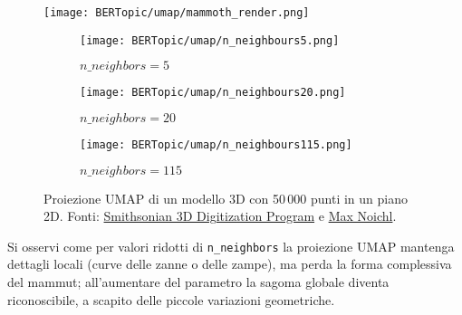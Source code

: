 \begin{figure}[H]
\centering
\texttt{[image: BERTopic/umap/mammoth\_render.png]}

\begin{subfigure}{0.32\textwidth}
    \centering
    \texttt{[image: BERTopic/umap/n\_neighbours5.png]}
    \caption{$n\_neighbors = 5$}
\end{subfigure}\hfill
\begin{subfigure}{0.32\textwidth}
    \centering
    \texttt{[image: BERTopic/umap/n\_neighbours20.png]}
    \caption{$n\_neighbors = 20$}
\end{subfigure}\hfill
\begin{subfigure}{0.32\textwidth}
    \centering
    \texttt{[image: BERTopic/umap/n\_neighbours115.png]}
    \caption{$n\_neighbors = 115$}
\end{subfigure}
\caption{Proiezione UMAP di un modello 3D con 50\,000 punti in un piano 2D. Fonti: \href{https://3d.si.edu/object/3d/mammuthus-primigenius-blumbach:341c96cd-f967-4540-8ed1-d3fc56d31f12}{Smithsonian 3D Digitization Program} e \href{https://www.maxnoichl.eu/projects/mammoth/}{Max Noichl}.}
\label{fig:umap-mammoth}
\end{figure}Si osservi come per valori ridotti di \texttt{n\_neighbors} la proiezione UMAP mantenga dettagli locali (curve delle zanne o delle zampe), ma perda la forma complessiva del mammut; all'aumentare del parametro la sagoma globale diventa riconoscibile, a scapito delle piccole variazioni geometriche.
